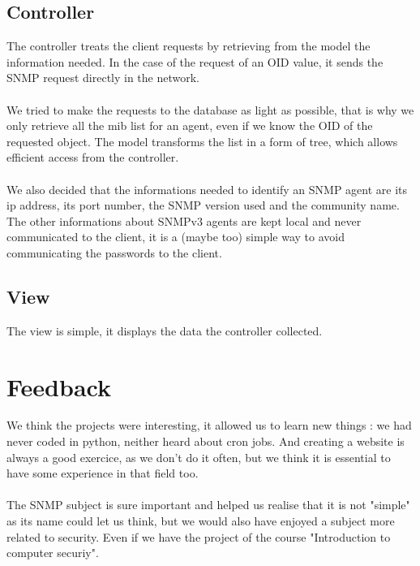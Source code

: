 \documentclass[a4paper,titlepage]{article}
\begin{document}
\subsection{Controller}
The controller treats the client requests by retrieving from the model the information needed. In the case of the request of an OID value, it sends the SNMP request directly in the network.\\ \\

We tried to make the requests to the database as light as possible, that is why we only retrieve all the mib list for an agent, even if we know the OID of the requested object. The model transforms the list in a form of tree, which allows efficient access from the controller. \\ \\

We also decided that the informations needed to identify an SNMP agent are its ip address, its port number, the SNMP version used and the community name. The other informations about SNMPv3 agents are kept local and never communicated to the client, it is a (maybe too) simple way to avoid communicating the passwords to the client. 


\subsection{View}
The view is simple, it displays the data the controller collected. 



\section{Feedback} 
We think the projects were interesting, it allowed us to learn new things : we had never coded in python, neither heard about cron jobs. And creating a website is always a good exercice, as we don't do it often, but we think it is essential to have some experience in that field too. \\ \\
The SNMP subject is sure important and helped us realise that it is not "simple" as its name could let us think, but we would also have enjoyed a subject more related to security. Even if we have the project of the course "Introduction to computer securiy".
\end{document}
